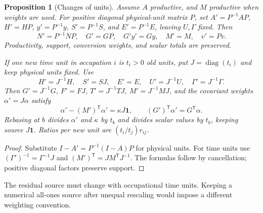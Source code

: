\documentclass[11pt,a4paper]{article}
\newtheorem{proposition}[theorem]{Proposition}
\begin{document}
\begin{proposition}[Changes of units]
Assume $A$ productive, and $M$ productive when weights are used. For positive diagonal physical-unit matrix $P$, set $A'=P^{-1}AP$, $H'=HP$, $y'=P^{-1}y$, $S'=P^{-1}S$, and $E'=P^{-1}E$, leaving $U,\Gamma$ fixed. Then
\begin{equation}
N'=P^{-1}NP,\quad G'=GP,\quad G'y'=Gy,\quad M'=M,\quad v'=Pv.
\end{equation}
Productivity, support, conversion weights, and scalar totals are preserved.

If one new time unit in occupation $i$ is $t_i>0$ old units, put $J=\operatorname{diag}(t_i)$ and keep physical units fixed. Use
\begin{equation}
H'=J^{-1}H,\quad S'=SJ,\quad E'=E,\quad U'=J^{-1}U,\quad\Gamma'=J^{-1}\Gamma.
\end{equation}
Then $G'=J^{-1}G$, $F'=FJ$, $T'=J^{-1}TJ$, $M'=J^{-1}MJ$, and the covariant weights $\alpha'=J\alpha$ satisfy
\begin{equation}
\alpha'-(M')^{\mathsf T}\alpha'=\kappa J\mathbf1,\qquad
(G')^{\mathsf T}\alpha'=G^{\mathsf T}\alpha.
\end{equation}
Rebasing at $b$ divides $\alpha'$ and $\kappa$ by $t_b$ and divides scalar values by $t_b$, keeping source $J\mathbf1$. Ratios per new unit are $(t_i/t_j)r_{ij}$.
\end{proposition}
\begin{proof}
Substitute $I-A'=P^{-1}(I-A)P$ for physical units. For time units use $(\Gamma')^{-1}=\Gamma^{-1}J$ and $(M')^{\mathsf T}=JM^{\mathsf T}J^{-1}$. The formulas follow by cancellation; positive diagonal factors preserve support.
\end{proof}

The residual source must change with occupational time units. Keeping a numerical all-ones source after unequal rescaling would impose a different weighting convention.
\end{document}
